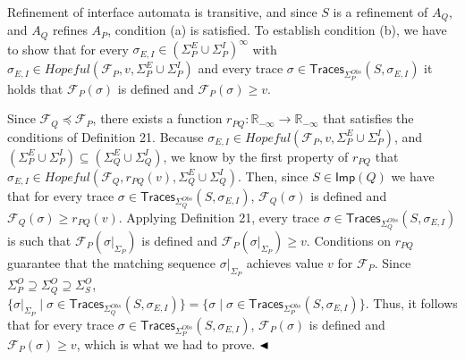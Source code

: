 \documentclass[10pt,a4paper]{article}
\begin{document}
 
 
Refinement of interface automata is transitive, and since $S$ is a refinement of $A_{Q}$, and $A_{Q}$ refines $A_{P}$, condition (a) is satisfied. To establish condition (b), we have to show that for every $\sigma_{E,I}\in(\Sigma_{P}^{E}\cup\Sigma_{P}^{I})^{\infty}$ with $\sigma_{E,I}\in\mathit{Hopeful}(\mathcal{F}_{P},v,\Sigma_{P}^{E}\cup\Sigma_{P}^{I})$ and every trace $\sigma\in\mathsf{Traces}_{\Sigma_{P}^{Obs}}(S,\sigma_{E,I})$ it holds that $\mathcal{F}_{P}(\sigma)$ is defined and $\mathcal{F}_{P}(\sigma)\geq v$.\par
 
 
 
Since $\mathcal{F}_{Q}\preceq\mathcal{F}_{P}$, there exists a function $r_{PQ}:\mathbb{R}_{-\infty}\to\mathbb{R}_{-\infty}$ that satisfies the conditions of Definition 21. Because $\sigma_{E,I}\in\mathit{Hopeful}(\mathcal{F}_{P},v,\Sigma_{P}^{E}\cup\Sigma_{P}^{I})$, and $(\Sigma_{P}^{E}\cup\Sigma_{P}^{I})\subseteq(\Sigma_{Q}^{E}\cup\Sigma_{Q}^{I})$, we know by the first property of $r_{PQ}$ that $\sigma_{E,I}\in\mathit{Hopeful}(\mathcal{F}_{Q},r_{PQ}(v),\Sigma_{Q}^{E}\cup\Sigma_{Q}^{I})$. Then, since $S\in\mathsf{Imp}(Q)$ we have that for every trace $\sigma\in\mathsf{Traces}_{\Sigma_{Q}^{Obs}}(S,\sigma_{E,I})$, $\mathcal{F}_{Q}(\sigma)$ is defined and $\mathcal{F}_{Q}(\sigma)\geq r_{PQ}(v)$. Applying Definition 21, every trace $\sigma\in\mathsf{Traces}_{\Sigma_{Q}^{Obs}}(S,\sigma_{E,I})$ is such that $\mathcal{F}_{P}(\sigma|_{\Sigma_{P}})$ is defined and $\mathcal{F}_{P}(\sigma|_{\Sigma_{P}})\geq v$. Conditions on $r_{PQ}$ guarantee that the matching sequence $\sigma|_{\Sigma_{P}}$ achieves value $v$ for $\mathcal{F}_{P}$. Since $\Sigma_{P}^{O}\supseteq\Sigma_{Q}^{O}\supseteq\Sigma_{S}^{O}$, $\{\sigma|_{\Sigma_{P}}\mid\sigma\in\mathsf{Traces}_{\Sigma_{Q}^{Obs}}(S,\sigma_{E,I})\}=\{\sigma\mid\sigma\in\mathsf{Traces}_{\Sigma_{P}^{Obs}}(S,\sigma_{E,I})\}$. Thus, it follows that for every trace $\sigma\in\mathsf{Traces}_{\Sigma_{P}^{Obs}}(S,\sigma_{E,I})$, $\mathcal{F}_{P}(\sigma)$ is defined and $\mathcal{F}_{P}(\sigma)\geq v$, which is what we had to prove. $\hfill\blacktriangleleft$\par
 
 
 
\end{document}
